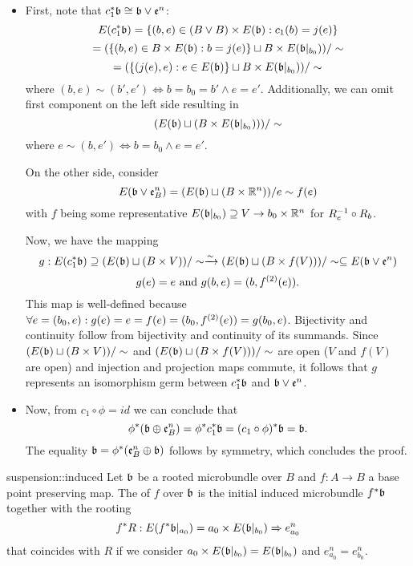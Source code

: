 \begin{myproof}
    \begin{itemize}
        \item First, note that $c_1^*\mathfrak{b} \cong \mathfrak{b} \vee \mathfrak{e}^{n}$:
        \[ E(c_1^*\mathfrak{b}) = \{(b, e) \in (B \vee B) \times E(\mathfrak{b}):c_1(b) = j(e)\} \]
        \[ = (\{(b, e) \in B \times E(\mathfrak{b}):b = j(e)\} \sqcup B \times E(\mathfrak{b}\vert_{b_0})) / \sim \]
        \[ = (\{(j(e), e):e \in E(\mathfrak{b})\} \sqcup B \times E(\mathfrak{b}\vert_{b_0})) / \sim \]
        where $(b, e) \sim (b', e') \iff b = b_0 = b' \land e = e'$.
        Additionally, we can omit first component on the left side resulting in
        \[ (E(\mathfrak{b}) \sqcup (B \times E(\mathfrak{b}\vert_{b_0}))) / \sim \]
        where $e \sim (b, e') \iff b = b_0 \land e = e'$.
        
        On the other side, consider
        \[ E(\mathfrak{b} \vee \mathfrak{e}^{n}_B) = (E(\mathfrak{b}) \sqcup (B \times \mathbb{R}^n)) / e \sim f(e) \]
        with $f$ being some representative $E(\mathfrak{b}\vert_{b_0}) \supseteq{} V \to b_0 \times \mathbb{R}^n$ for $R_e^{-1} \circ R_b$.
        
        Now, we have the mapping
        \[ g: E(c_1^*\mathfrak{b}) \supseteq{} (E(\mathfrak{b}) \sqcup (B \times V)) / \sim \xrightarrow{\sim} (E(\mathfrak{b}) \sqcup (B \times f(V))) / \sim \subseteq{} E(\mathfrak{b} \vee \mathfrak{e}^{n}) \]
        \[ g(e) = e \text{ and } g(b, e) = (b, f^{(2)}(e)). \]
        This map is well-defined because $\forall e = (b_0, e): g(e) = e = f(e) = (b_0, f^{(2)}(e)) = g(b_0, e)$.
        Bijectivity and continuity follow from bijectivity and continuity of its summands.
        Since $(E(\mathfrak{b}) \sqcup (B \times V)) / \sim$ and $(E(\mathfrak{b}) \sqcup (B \times f(V))) / \sim$ are open ($V$ and $f(V)$ are open)
        and injection and projection maps commute,
        it follows that $g$ represents an isomorphism germ between $c_1^*\mathfrak{b}$ and $\mathfrak{b} \vee \mathfrak{e}^{n}$.
    
        \item Now, from $c_1 \circ \phi = id$ we can conclude that
        \[ \phi^*(\mathfrak{b} \oplus{} \mathfrak{e}^{n}_B) = \phi^*c_1^*\mathfrak{b} = (c_1 \circ \phi)^*\mathfrak{b} = \mathfrak{b}. \]
        The equality $\mathfrak{b} = \phi^*(\mathfrak{e}^{n}_B \oplus{} \mathfrak{b})$ follows by symmetry, which concludes the proof.
    \end{itemize}
\end{myproof}

\begin{mydefinition}{suspension::induced}
    Let $\mathfrak{b}$ be a rooted microbundle over $B$ and $f: A \to B$ a base point preserving map.
    The  of $f$ over $\mathfrak{b}$ is the initial induced microbundle $f^*\mathfrak{b}$ together with the rooting
    \[ f^*R: E(f^*\mathfrak{b}\vert_{a_0}) = a_0 \times E(\mathfrak{b}\vert_{b_0}) \Rightarrow{} e^n_{a_0} \]
    that coincides with $R$ if we consider $a_0 \times E(\mathfrak{b}\vert_{b_0}) = E(\mathfrak{b}\vert_{b_0})$ and $e^n_{a_0} = e^n_{b_0}$.
\end{mydefinition}

